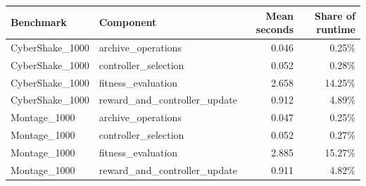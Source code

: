 \begin{tabular}{llrr}
\toprule
Benchmark & Component & Mean seconds & Share of runtime \\
\midrule
CyberShake\_1000 & archive\_operations & 0.046 & 0.25\% \\
CyberShake\_1000 & controller\_selection & 0.052 & 0.28\% \\
CyberShake\_1000 & fitness\_evaluation & 2.658 & 14.25\% \\
CyberShake\_1000 & reward\_and\_controller\_update & 0.912 & 4.89\% \\
Montage\_1000 & archive\_operations & 0.047 & 0.25\% \\
Montage\_1000 & controller\_selection & 0.052 & 0.27\% \\
Montage\_1000 & fitness\_evaluation & 2.885 & 15.27\% \\
Montage\_1000 & reward\_and\_controller\_update & 0.911 & 4.82\% \\
\bottomrule
\end{tabular}
